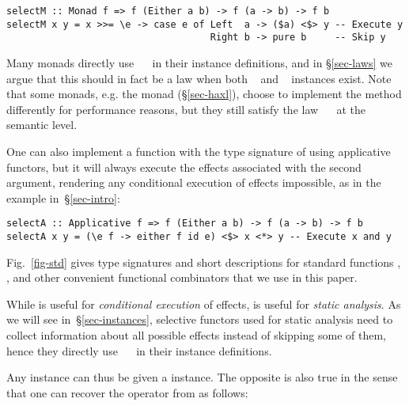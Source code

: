 \vspace{1mm}
\begin{verbatim}
selectM :: Monad f => f (Either a b) -> f (a -> b) -> f b
selectM x y = x >>= \e -> case e of Left  a -> ($a) <$> y -- Execute y
                                    Right b -> pure b     -- Skip y
\end{verbatim}
\vspace{1mm}

\noindent
Many monads directly use ~\hs{=}~ in their 
instance definitions, and in \S\ref{sec-laws} we argue that this should in fact
be a law when both ~ and ~ instances exist.
Note that some monads, e.g. the \Haxl monad (\S\ref{sec-haxl}), choose to
implement the   method differently for performance reasons, but they
still satisfy the law ~\hs{=}~ at the semantic level.

One can also implement a function with the type signature of  using
applicative functors, but it will always execute the effects associated with the
second argument, rendering any conditional execution of effects impossible, as
in the  example in~\S\ref{sec-intro}:

\vspace{1mm}
\begin{verbatim}
selectA :: Applicative f => f (Either a b) -> f (a -> b) -> f b
selectA x y = (\e f -> either f id e) <$> x <*> y -- Execute x and y
\end{verbatim}
\vspace{1mm}

\noindent
Fig.~\ref{fig-std} gives type signatures and short descriptions for standard
functions , , and other convenient functional combinators that
we use in this paper.

While  is useful for \emph{conditional execution} of effects,
 is useful for \emph{static analysis}. As we will see
in~\S\ref{sec-instances}, selective functors used for static analysis need to
collect information about all possible effects instead of skipping some of them,
hence they directly use ~\hs{=}~ in their 
instance definitions.

Any  instance can thus be given a  instance. The
opposite is also true in the sense that one can recover the operator \hs{<*>}
from  as follows:

